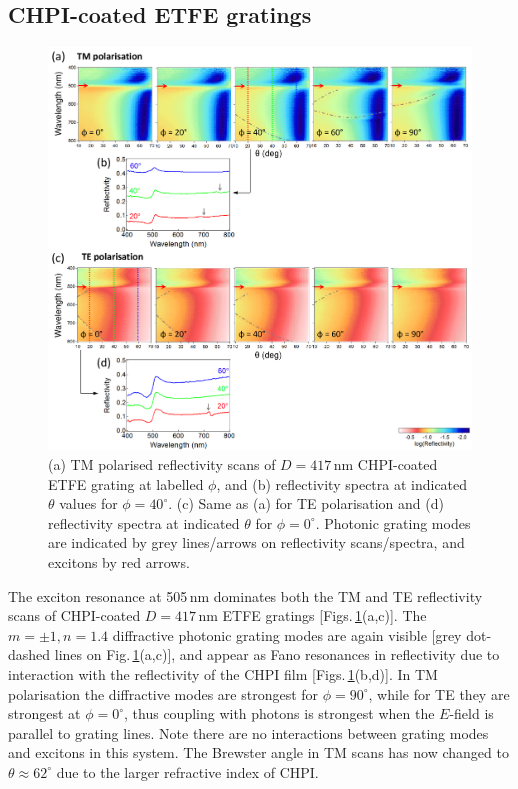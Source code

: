 \subsection{CHPI-coated ETFE gratings}
\begin{figure}[h!] 
\centering    
\includegraphics[width=\textwidth]{Fig3}
\caption[Reflectivity measurements of $D=417$\,nm CHPI-coated ETFE grating in (a,b) TM and (c,d) TE polarisation.]{(a) TM polarised reflectivity scans of $D=417$\,nm CHPI-coated ETFE grating at labelled $\phi$, and (b) reflectivity spectra at indicated $\theta$ values for $\phi=40^{\circ}$. (c) Same as (a) for TE polarisation and (d) reflectivity spectra at indicated $\theta$ for $\phi=0^{\circ}$. Photonic grating modes are indicated by grey lines/arrows on reflectivity scans/spectra, and excitons by red arrows.}
\label{7Fig3}
\end{figure}
The exciton resonance at 505\,nm dominates both the TM and TE reflectivity scans of CHPI-coated $D=417$\,nm ETFE gratings [Figs.\,\ref{7Fig3}(a,c)]. The $m=\pm1, n=1.4$ diffractive photonic grating modes are again visible [grey dot-dashed lines on Fig.\,\ref{7Fig3}(a,c)], and appear as Fano resonances in reflectivity due to interaction with the reflectivity of the CHPI film [Figs.\,\ref{7Fig3}(b,d)]. In TM polarisation the diffractive modes are strongest for $\phi=90^{\circ}$, while for TE they are strongest at $\phi=0^{\circ}$, thus coupling with photons is strongest when the $E$-field is parallel to grating lines. Note there are no interactions between grating modes and excitons in this system. The Brewster angle in TM scans has now changed to $\theta\approx62^{\circ}$ due to the larger refractive index of CHPI.


